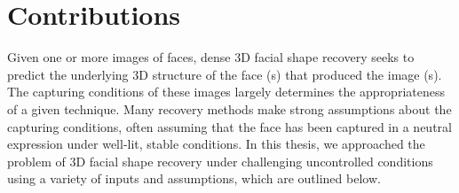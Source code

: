 \section{Contributions}\label{sec:intro_contrib}
Given one or more images of faces, dense 3D facial shape recovery seeks to
predict the underlying 3D structure of the face (s) that produced the image (s).
The capturing conditions of these images largely determines the appropriateness
of a given technique. Many recovery methods make strong assumptions about
the capturing conditions, often assuming that the face has been captured in
a neutral expression under well-lit, stable conditions.
In this thesis, we approached the problem of 3D facial shape recovery under
challenging uncontrolled conditions using a variety of inputs and
assumptions, which are outlined below.

